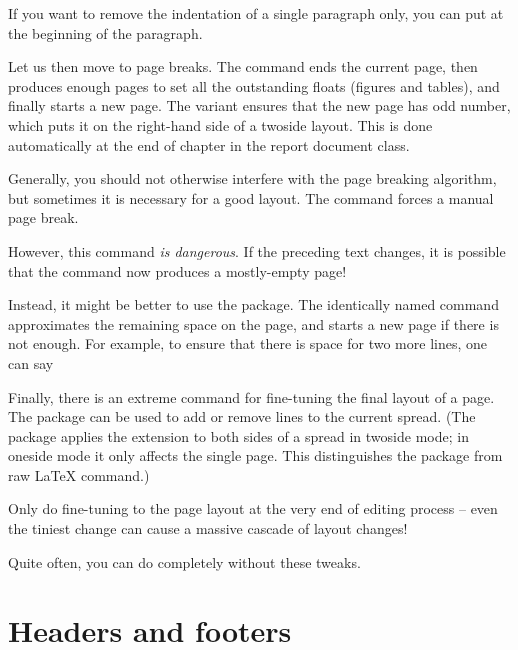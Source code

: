 If you want to remove the indentation of a single paragraph only,
you can put  at the beginning of the paragraph.

\bigskip

Let us then move to page breaks.
The  command ends the current page,
then produces enough pages to set all the outstanding floats (figures and tables),
and finally starts a new page.
The  variant ensures that the new page has odd number,
which puts it on the right-hand side of a twoside layout.
This is done automatically at the end of chapter in the \textsf{report} document class.

Generally, you should not otherwise interfere with the page breaking algorithm,
but sometimes it is necessary for a good layout.
The  command forces a manual page break.

However, this command \emph{is dangerous}.
If the preceding text changes, it is possible that the  command now produces
a mostly-empty page!

Instead, it might be better to use the  package.
The identically named command approximates the remaining space on the page,
and starts a new page if there is not enough.
For example, to ensure that there is space for two more lines,
one can say
%
\begin{ExampleCode}
\end{ExampleCode}

Finally, there is an extreme command for fine-tuning the final layout of a page.
The  package can be used to add or remove lines to the current spread.
(The package applies the extension to both sides of a spread in twoside mode;
in oneside mode it only affects the single page.
This distinguishes the package from raw \LaTeX{}  command.)

\begin{warning}
Only do fine-tuning to the page layout at the very end of editing process
-- even the tiniest change can cause a massive cascade of layout changes!

Quite often, you can do completely without these tweaks.
\end{warning}


%
%
%
\section{Headers and footers}

